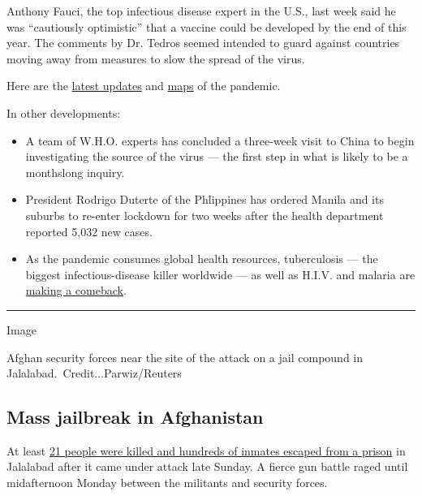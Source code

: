 Anthony Fauci, the top infectious disease expert in the U.S., last week
said he was ``cautiously optimistic'' that a vaccine could be developed
by the end of this year. The comments by Dr. Tedros seemed intended to
guard against countries moving away from measures to slow the spread of
the virus.

Here are the
\href{https://www.nytimes3xbfgragh.onion/2020/08/03/world/coronavirus-covid-19.html?action=click\&pgtype=Article\&state=default\&module=styln-coronavirus\&region=TOP_BANNER\&context=storylines_menu}{latest
updates} and
\href{https://www.nytimes3xbfgragh.onion/interactive/2020/world/coronavirus-maps.html}{maps}
of the pandemic.

In other developments:

\begin{itemize}
\item
  A team of W.H.O. experts has concluded a three-week visit to China to
  begin investigating the source of the virus --- the first step in what
  is likely to be a monthslong inquiry.
\item
  President Rodrigo Duterte of the Phlippines has ordered Manila and its
  suburbs to re-enter lockdown for two weeks after the health department
  reported 5,032 new cases.
\item
  As the pandemic consumes global health resources, tuberculosis --- the
  biggest infectious-disease killer worldwide --- as well as H.I.V. and
  malaria are
  \href{https://www.nytimes3xbfgragh.onion/2020/08/03/health/coronavirus-tuberculosis-aids-malaria.html}{making
  a comeback}.
\end{itemize}

\begin{center}\rule{0.5\linewidth}{\linethickness}\end{center}

Image

Afghan security forces near the site of the attack on a jail compound in
Jalalabad.~Credit...Parwiz/Reuters

\hypertarget{mass-jailbreak-in-afghanistan}{%
\subsection{Mass jailbreak in
Afghanistan}\label{mass-jailbreak-in-afghanistan}}

At least
\href{https://www.nytimes3xbfgragh.onion/2020/08/03/world/asia/afghanistan-prison-isis-taliban.html}{21
people were killed and hundreds of inmates escaped from a prison} in
Jalalabad after it came under attack late Sunday. A fierce gun battle
raged until midafternoon Monday between the militants and security
forces.

